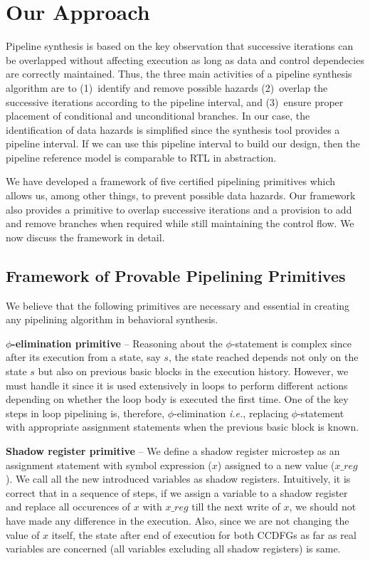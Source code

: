 \section{Our Approach}
\label{sec:pipelining-algorithm}
Pipeline synthesis is based on the key observation that successive iterations can be overlapped without affecting execution as long
as data and control dependecies are correctly maintained. 
Thus, the three main activities of a pipeline synthesis algorithm are to (1)~identify and remove possible hazards (2)~overlap the
successive iterations according to the pipeline interval, and 
(3)~ensure proper placement of conditional and unconditional branches. In our case,
the identification of data hazards is simplified since the synthesis tool
provides a pipeline interval. If we can use this pipeline interval to build our design, 
then the pipeline reference model is comparable to RTL in abstraction. 

We have developed a framework of five certified pipelining
primitives which allows us, among other things, to prevent possible data
hazards. Our framework also provides a primitive
to overlap successive iterations and a provision to add and remove 
branches when required while still maintaining the control flow. We now discuss
the framework in detail.

\subsection{Framework of Provable Pipelining Primitives}

We believe that the following primitives are necessary and essential in creating any pipelining
algorithm in behavioral synthesis.

{\textbf {$\phi$-elimination primitive}} -- 
Reasoning about the $\phi$-statement is complex since after its
execution from a state, say $s$, the state reached depends not only
on the state $s$ but also on previous basic blocks in the execution history.
However, we must handle it since it is used extensively in
loops to perform different actions depending on whether the
loop body is executed the first time. One of the key steps in loop pipelining is,
therefore, $\phi$-elimination {\em i.e.}, replacing
$\phi$-statement with appropriate assignment statements when the previous basic block is known.

{\textbf {Shadow register primitive}} -- We define a shadow register microstep as an assignment
statement with symbol expression ($x$) assigned to a new value ($x\_reg$). We call all the new introduced 
variables as shadow registers. Intuitively, it is correct that in a sequence of steps, if we assign a variable 
to a shadow register and replace all occurences of $x$ with $x\_reg$
till the next write of $x$, we should
not have made any difference in the execution. Also, since we are not changing the value of $x$ itself, 
the state after end of execution for both CCDFGs as far as real variables are concerned (all variables
 excluding all shadow registers) is same. 

